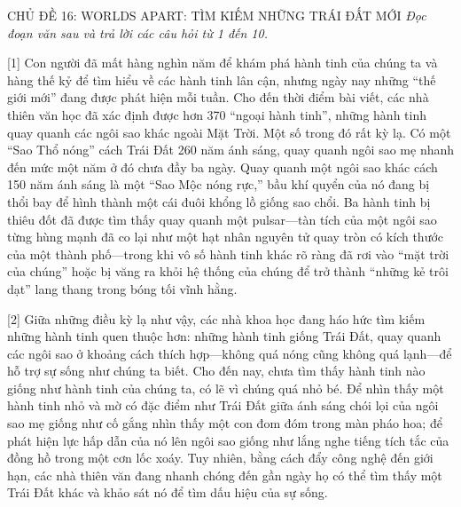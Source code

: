 \documentclass[12pt,a4paper,twoside]{article}
\newenvironment{readingpassage}[1][]{%
    \begin{tcolorbox}[enhanced, colback=grayLight, colframe=secondaryBlue,
        coltitle=textDark, fonttitle=\bfseries, title={#1},
        rounded corners, arc=3mm, boxrule=1pt,
        left=15pt, right=15pt, top=10pt, bottom=10pt,
        breakable, before skip=10pt, after skip=10pt, drop fuzzy shadow]
    \setstretch{1.3}
}{\end{tcolorbox}}
\begin{document}
\newpage
\label{a_cd16}
\begin{topicbox}{\large CHỦ ĐỀ 16: WORLDS APART: TÌM KIẾM NHỮNG TRÁI ĐẤT MỚI}
\vspace{8pt}
\textit{Đọc đoạn văn sau và trả lời các câu hỏi từ 1 đến 10.}
\vspace{6pt}
\end{topicbox}
\vspace{5pt}
\begin{readingpassage}[]
[1] Con người đã mất hàng nghìn năm để khám phá hành tinh của chúng ta và hàng thế kỷ để tìm hiểu về các hành tinh lân cận, nhưng ngày nay những ``thế giới mới'' đang được phát hiện mỗi tuần. Cho đến thời điểm bài viết, các nhà thiên văn học đã xác định được hơn 370 ``ngoại hành tinh'', những hành tinh quay quanh các ngôi sao khác ngoài Mặt Trời. Một số trong đó rất kỳ lạ. Có một ``Sao Thổ nóng'' cách Trái Đất 260 năm ánh sáng, quay quanh ngôi sao mẹ nhanh đến mức một năm ở đó chưa đầy ba ngày. Quay quanh một ngôi sao khác cách 150 năm ánh sáng là một ``Sao Mộc nóng rực,'' bầu khí quyển của nó đang bị thổi bay để hình thành một cái đuôi khổng lồ giống sao chổi. Ba hành tinh bị thiêu đốt đã được tìm thấy quay quanh một pulsar—tàn tích của một ngôi sao từng hùng mạnh đã co lại như một hạt nhân nguyên tử quay tròn có kích thước của một thành phố—trong khi vô số hành tinh khác rõ ràng đã rơi vào ``mặt trời của chúng'' hoặc bị văng ra khỏi hệ thống của chúng để trở thành ``những kẻ trôi dạt'' lang thang trong bóng tối vĩnh hằng.

[2] Giữa những điều kỳ lạ như vậy, các nhà khoa học đang háo hức tìm kiếm những hành tinh quen thuộc hơn: những hành tinh giống Trái Đất, quay quanh các ngôi sao ở khoảng cách thích hợp—không quá nóng cũng không quá lạnh—để hỗ trợ sự sống như chúng ta biết. Cho đến nay, chưa tìm thấy hành tinh nào giống như hành tinh của chúng ta, có lẽ vì chúng quá nhỏ bé. Để nhìn thấy một hành tinh nhỏ và mờ có đặc điểm như Trái Đất giữa ánh sáng chói lọi của ngôi sao mẹ giống như cố gắng nhìn thấy một con đom đóm trong màn pháo hoa; để phát hiện lực hấp dẫn của nó lên ngôi sao giống như lắng nghe tiếng tích tắc của đồng hồ trong một cơn lốc xoáy. Tuy nhiên, bằng cách đẩy công nghệ đến giới hạn, các nhà thiên văn đang nhanh chóng đến gần ngày họ có thể tìm thấy một Trái Đất khác và khảo sát nó để tìm dấu hiệu của sự sống.


\end{readingpassage}
\end{document}
